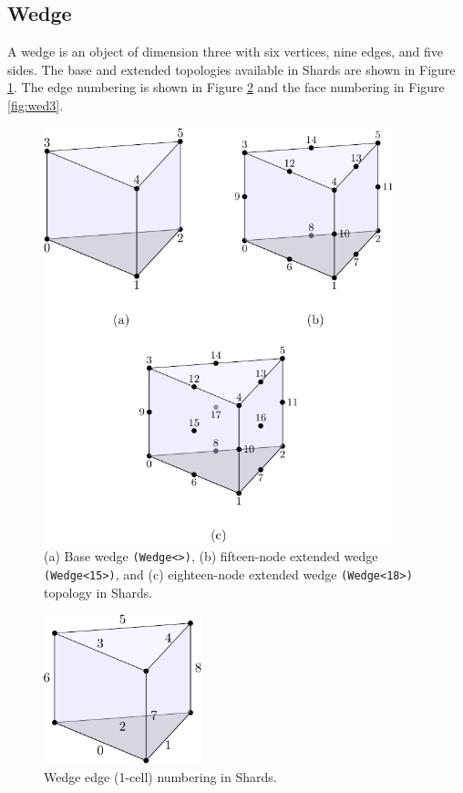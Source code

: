 \documentclass[pdf,12pt,relaxed]{SANDreport}
\begin{document}
\subsection{Wedge}
A wedge is an object of dimension three with six vertices, nine edges, and five sides. The base and extended topologies available in Shards are shown in Figure \ref{fig:wed1}. The edge numbering is shown in Figure \ref{fig:wed2} and the face numbering in Figure \ref{fig:wed3}.
 \begin{figure}[ht]
  \begin{center}
    \includegraphics[width=4.0in]{topo_figs/wedge_node.pdf}
  \end{center}
  \caption{(a) Base wedge {\tt (Wedge<>)}, (b) fifteen-node extended wedge {\tt (Wedge<15>)}, and (c) eighteen-node extended wedge {\tt (Wedge<18>)} topology in Shards.}
 \label{fig:wed1}
\end{figure}

\begin{figure}[ht]
  \begin{center}
    \includegraphics[width=1.8in]{topo_figs/wedge_edge.pdf}
 \end{center}
 \caption{Wedge edge (1-cell) numbering in Shards.}
 \label{fig:wed2}
\end{figure}
\end{document}
